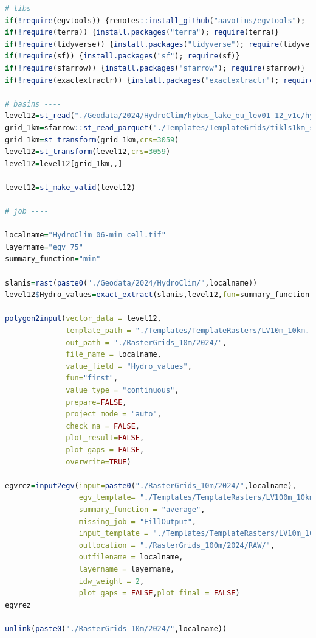 \documentclass[
]{book}
\begin{document}
\begin{lstlisting}[language=R]
# libs ----
if(!require(egvtools)) {remotes::install_github("aavotins/egvtools"); require(egvtools)}
if(!require(terra)) {install.packages("terra"); require(terra)}
if(!require(tidyverse)) {install.packages("tidyverse"); require(tidyverse)}
if(!require(sf)) {install.packages("sf"); require(sf)}
if(!require(sfarrow)) {install.packages("sfarrow"); require(sfarrow)}
if(!require(exactextractr)) {install.packages("exactextractr"); require(exactextractr)}

# basins ----
level12=st_read("./Geodata/2024/HydroClim/hybas_lake_eu_lev01-12_v1c/hybas_lake_eu_lev12_v1c.shp")
grid_1km=sfarrow::st_read_parquet("./Templates/TemplateGrids/tikls1km_sauzeme.parquet")
grid_1km=st_transform(grid_1km,crs=3059)
level12=st_transform(level12,crs=3059)
level12=level12[grid_1km,,]

level12=st_make_valid(level12)

# job ----

localname="HydroClim_06-min_cell.tif"
layername="egv_75"
summary_function="min"
  
slanis=rast(paste0("./Geodata/2024/HydroClim/",localname))
level12$Hydro_values=exact_extract(slanis,level12,fun=summary_function)
  
polygon2input(vector_data = level12,
              template_path = "./Templates/TemplateRasters/LV10m_10km.tif",
              out_path = "./RasterGrids_10m/2024/",
              file_name = localname,
              value_field = "Hydro_values",
              fun="first",
              value_type = "continuous",
              prepare=FALSE,
              project_mode = "auto",
              check_na = FALSE,
              plot_result=FALSE,
              plot_gaps = FALSE,
              overwrite=TRUE)
  
egvrez=input2egv(input=paste0("./RasterGrids_10m/2024/",localname),
                 egv_template= "./Templates/TemplateRasters/LV100m_10km.tif",
                 summary_function = "average",
                 missing_job = "FillOutput",
                 input_template = "./Templates/TemplateRasters/LV10m_10km.tif",
                 outlocation = "./RasterGrids_100m/2024/RAW/",
                 outfilename = localname,
                 layername = layername,
                 idw_weight = 2,
                 plot_gaps = FALSE,plot_final = FALSE)
egvrez
  
unlink(paste0("./RasterGrids_10m/2024/",localname))
\end{lstlisting}
\end{document}
